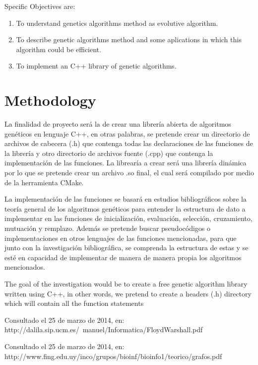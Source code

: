 \documentclass[letterpaper]{article}
\begin{document}
Specific Objectives are:\\

\begin{enumerate}
\item To understand genetics algorithms method as evolutive algorithm.
\item To describe genetic algorithms method and some aplications in which this algorithm could be efficient.
\item To implement an C++ library of genetic algorithms.
\end{enumerate}

\section{Methodology}

La finalidad de proyecto será la de crear una librería abierta de algoritmos genéticos en lenguaje C++, en otras palabras, se pretende crear un directorio de archivos de cabecera (.h) que contenga todas las declaraciones de las funciones de la librería y otro directorio de archivos fuente (.cpp) que contenga la implementación de las funciones. La librearía a crear será una librería dinámica por lo que se pretende crear un archivo .so final, el cual será compilado por medio de la herramienta CMake.

La implementación de las funciones se basará en estudios bibliográficos sobre la teoría general de los algoritmos genéticos para entender la estructura de dato a implementar en las funciones de inicialización, evaluación, selección, cruzamiento, mutuación y remplazo. Además se pretende buscar pseudocódigos o implementaciones en otros lenguajes de las funciones mencionadas, para que junto con la investigación bibliográfica, se comprenda la estructura de estas y se esté en capacidad de implementar de manera de manera propia los algoritmos mencionados.


The goal of the investigation would be to create a free genetic algorithm library written using C++, in other words, we pretend to create a headers (.h) directory which will contain all the function statements




\begin{thebibliography}{99}
Consultado el 25 de marzo de 2014, en: http://dalila.sip.ucm.es/~manuel/Informatica/FloydWarshall.pdf

Consultado el 25 de marzo de 2014, en: http://www.fing.edu.uy/inco/grupos/bioinf/bioinfo1/teorico/grafos.pdf

\end{thebibliography}
\end{document}
